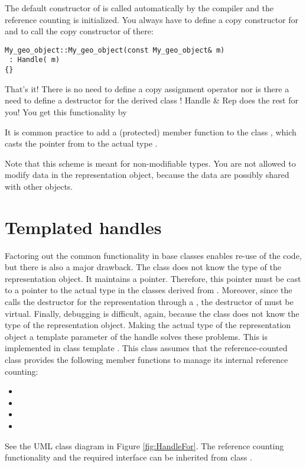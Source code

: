 The default constructor of  is called automatically
by the compiler and the reference counting is initialized. 
You always have to define a copy constructor for  
and to call the copy constructor of  there:

\begin{verbatim}
My_geo_object::My_geo_object(const My_geo_object& m)
 : Handle( m) 
{}
\end{verbatim}

That's it!
There is no need to define a copy assignment operator nor is there a 
need to define a destructor for the derived class !  
Handle \& Rep does the rest for you!
You get this functionality by


It is common practice to add a (protected) member function 
to the class ,
which casts the  pointer from  to the actual type
. 

Note that this scheme is meant for non-modifiable types. You are not allowed
to modify data in the representation object, because the data are possibly
shared with other  objects.

\section{Templated handles}
Factoring out the common functionality in base classes enables re-use of 
the code, but there is also a major drawback. The  class does not
know the type of the representation object. It maintains a  pointer.
Therefore, this pointer must be cast to a pointer to the actual type
in the classes derived from . Moreover, since the 
calls the destructor for the representation through a , the
destructor of  must be virtual. Finally, debugging is difficult,
again, because the  class does not know the type of the 
representation object.
Making the actual type of the representation object a template parameter
of the handle solves these problems. This is implemented in class template
.%
This class assumes that the reference-counted class provides the
following member functions
to manage its internal reference counting: 
\def\ccIndexClassName{Ref_counted}
\begin{itemize}
\item{}
\item{}
\item{}
\item{}
\end{itemize}
See the UML class diagram in Figure \ref{fig:HandleFor}.
The reference counting functionality and the required
interface can be inherited from class .

